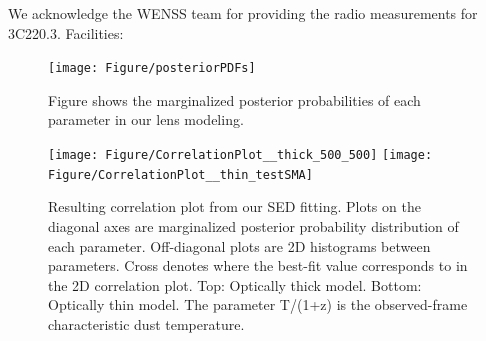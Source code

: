 \documentclass[twocolumn,apj,numberedappendix]{emulateapj}
\begin{document}
\acknowledgments

We acknowledge the WENSS team for providing the radio measurements for 3C220.3.
Facilities: 




\appendix

\begin{figure}[!tbp]
\centering
\texttt{[image: Figure/posteriorPDFs]}
\caption{Figure shows the marginalized posterior probabilities of each parameter in our lens modeling.
\label{fig:LensPDF}}
\end{figure}

\begin{figure}[!tbp]
\centering
\texttt{[image: Figure/CorrelationPlot\_\_thick\_500\_500]}
\texttt{[image: Figure/CorrelationPlot\_\_thin\_testSMA]}
\caption{Resulting correlation plot from our SED fitting. Plots on the diagonal axes are marginalized posterior probability 
distribution of each
parameter. Off-diagonal plots are 2D histograms between parameters. Cross denotes where the best-fit value corresponds to in 
the 2D correlation plot. Top: Optically thick
model. Bottom: Optically thin model. The parameter T/(1+z) is the observed-frame characteristic dust temperature.
\label{fig:sedlikelihood}}
\end{figure}
\end{document}
